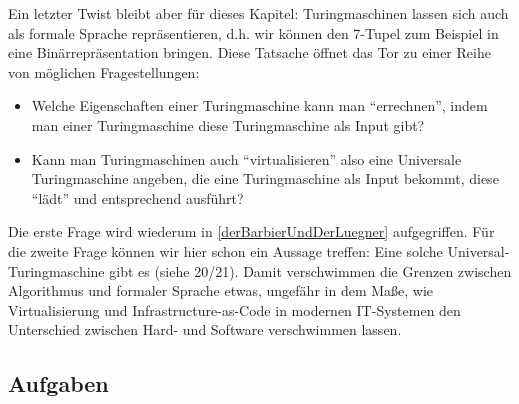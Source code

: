 Ein letzter Twist bleibt aber für dieses Kapitel:
Turingmaschinen lassen sich auch als formale Sprache repräsentieren,
d.h. wir können den 7-Tupel zum Beispiel in eine Binärrepräsentation bringen.
Diese Tatsache öffnet das Tor zu einer Reihe von möglichen Fragestellungen:
\begin{itemize}
    \item Welche Eigenschaften einer Turingmaschine kann man ``errechnen'',
        indem man einer Turingmaschine diese Turingmaschine als Input gibt?
    \item Kann man Turingmaschinen auch ``virtualisieren'' also eine Universale
        Turingmaschine angeben, die eine Turingmaschine als Input bekommt,
        diese ``lädt'' und entsprechend ausführt?
\end{itemize}
Die erste Frage wird wiederum in \autoref{derBarbierUndDerLuegner} aufgegriffen.
Für die zweite Frage können wir hier schon ein Aussage treffen:
Eine solche Universal-Turingmaschine gibt es (siehe \cite{CC} 20/21).
Damit verschwimmen die Grenzen zwischen Algorithmus und formaler Sprache etwas,
ungefähr in dem Maße,
wie Virtualisierung und Infrastructure-as-Code in modernen IT-Systemen
den Unterschied zwischen Hard- und Software verschwimmen lassen.

\subsection*{Aufgaben}

